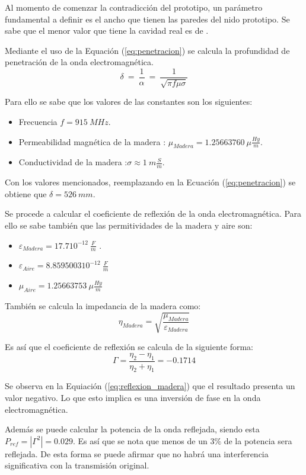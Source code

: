 %


Al momento de comenzar la contradicción del prototipo, un parámetro fundamental a definir es el ancho que tienen las paredes del nido prototipo. Se sabe que el menor valor que tiene la cavidad real es de  \cite{ref:PaperValeriaOjeda}.

Mediante el uso de la Equación (\ref{eq:penetracion}) se calcula la profundidad de penetración de la onda electromagnética.
\begin{equation}
\delta \ = \ \frac{1}{\alpha} \ =\ \frac{1}{\sqrt{\pi f \mu \sigma}}
\label{eq:penetracion}
\end{equation}

Para ello se sabe que los valores de las constantes son los siguientes:
\begin{itemize}
	\item Frecuencia $f = 915 \ MHz$.
	\item Permeabilidad magnética de la madera \cite{ref:permeabilidad_madera}: $\mu_{Madera} = 1.25663760 \ \mu \frac{Hy}{m}$.
	\item Conductividad de la madera \cite{ref:conductividad_madera}:$\sigma \approx 1 \ m\frac{S}{m}$.
\end{itemize}

Con los valores mencionados, reemplazando en la Ecuación (\ref{eq:penetracion}) se obtiene que $\delta = 526 \ mm$.

Se procede a calcular el coeficiente de reflexión de la onda electromagnética. Para ello se sabe también que las permitividades de la madera y aire son:
\begin{itemize}
	\item $\varepsilon_{Madera} = 17.7 10^{-12} \ \frac{F}{m}$ \cite{ref:varepsilon_madera}.
	\item $\varepsilon_{Aire} = 8.8595003 10^{-12} \ \frac{F}{m}$
	\item $\mu_{Aire} = 1.25663753 \ \mu \frac{ Hy}{m}$ 
\end{itemize}

También se calcula la impedancia de la madera como:
\begin{equation}
	\eta_{Madera}=\sqrt{\frac{\mu_{Madera}}{\varepsilon_{Madera}}}
\end{equation}

Es así que el coeficiente de reflexión se calcula de la siguiente forma:
\begin{equation}
	\Gamma = \frac{\eta_2 - \eta_1  }{\eta_2 + \eta_1} = -0.1714
	\label{eq:reflexion_madera}
\end{equation}

Se observa en la Equiación (\ref{eq:reflexion_madera}) que el resultado presenta un valor negativo. Lo que esto implica es una inversión de fase en la onda electromagnética.

Además se puede calcular la potencia de la onda reflejada, siendo esta $P_{ref} = |\Gamma^2| = 0.029$. Es así que se nota que menos de un $3\%$ de la potencia sera reflejada. De esta forma se puede afirmar que no habrá una interferencia significativa con la transmisión original. 

